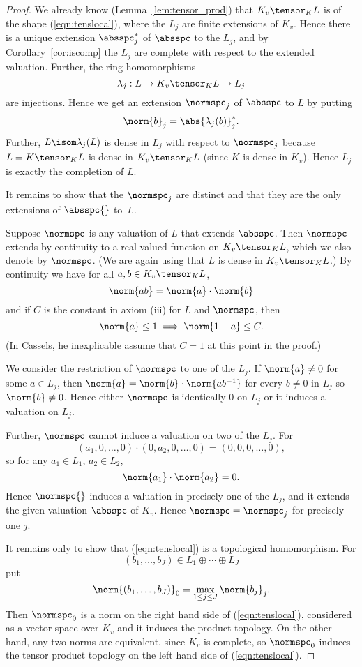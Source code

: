 \begin{proof}
  We already know (Lemma~\ref{lem:tensor_prod}) that $K_v\tensor_K L$
  is of the shape (\ref{eqn:tenslocal}), where the $L_j$ are finite
  extensions of $K_v$.  Hence there is a unique extension
  $\absspc_j^*$ of $\absspc$ to the $L_j$, and by
  Corollary~\ref{cor:iscomp} the $L_j$ are complete with respect to
  the extended valuation.  Further,  the
  ring homomorphisms
  $$
  \lambda_j : L \to K_v\tensor_K L \to L_j
  $$
  are injections.   Hence we get an extension $\normspc_j$ of $\absspc$ to $L$ by putting 
$$
\norm{b}_j = \abs{\lambda_j(b)}_j^*.
$$
Further, $L\isom \lambda_j(L)$ is dense in $L_j$ with respect to $\normspc_j$ because
$L = K\tensor_K L$ is dense in $K_v\tensor_K L$ (since $K$ is dense
in $K_v$).  Hence $L_j$ is exactly the completion of $L$.

It remains to show that the $\normspc_j$ are distinct and that they
are the only extensions of $\absspc{}$ to~$L$.

Suppose $\normspc$ is any valuation of $L$ that extends $\absspc$.  Then
$\normspc$ extends by continuity to a real-valued function on $K_v\tensor_K L$,
which we also denote by $\normspc$. (We are again using that $L$ is dense
in $K_v\tensor_K L$.)  By continuity we have for all $a,b\in K_v\tensor_K L$,
$$
  \norm{ab} = \norm{a}\cdot \norm{b}
$$
and if $C$ is the constant in axiom (iii) for $L$ and $\normspc$, then
$$
 \norm{a}\leq 1 \implies \norm{1+a}\leq C.
$$
(In Cassels, he inexplicable assume that $C=1$ at this point in the proof.)

We consider the restriction of $\normspc$ to one of the $L_j$.  If $\norm{a}\neq 0$
for some $a\in L_j$, then $\norm{a} = \norm{b}\cdot \norm{ab^{-1}}$ for every
$b\neq 0$ in $L_j$ so $\norm{b} \neq 0$.  Hence either $\normspc$ is identically
$0$ on $L_j$ or it induces a valuation on $L_j$.

Further, $\normspc$ cannot induce a valuation on two of the $L_j$.  For
$$
  (a_1,0,\ldots, 0)\cdot (0,a_2,0,\ldots,0) = (0,0,0,\ldots,0),
$$
so for any $a_1\in L_1$, $a_2\in L_2$,
$$
  \norm{a_1}\cdot \norm{a_2} = 0.
$$
Hence $\normspc{}$ induces a valuation in precisely one of the $L_j$,
and it extends the given valuation $\absspc$ of $K_v$.  Hence $\normspc = \normspc_j$
for precisely one $j$.

It remains only to show that (\ref{eqn:tenslocal}) is a topological homomorphism.
For $$(b_1,\ldots, b_J)\in L_1\oplus \cdots \oplus L_J$$ put
$$
\norm{(b_1,\ldots, b_J)}_0 = \max_{1\leq j \leq J} \norm{b_j}_j.
$$
Then $\normspc_0$ is a norm on the right hand side of (\ref{eqn:tenslocal}),
considered as a vector space over $K_v$ and it induces the product topology.
On the other hand, any two norms are equivalent, since $K_v$ is complete,
so $\normspc_0$ induces the tensor product topology on the left hand side of
(\ref{eqn:tenslocal}).
\end{proof}

